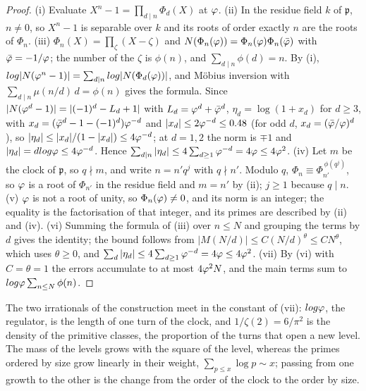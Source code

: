 \begin{proof}
(i) Evaluate $X^n-1=\prod_{d\mid n}\Phi_d(X)$ at $\varphi$.
(ii) In the residue field $k$ of $\mathfrak p$, $n\neq0$, so $X^n-1$ is separable over $k$ and its
roots of order exactly $n$ are the roots of $\Phi_n$.
(iii) $\Phi_n(X)=\prod_\zeta(X-\zeta)$ and $N(\Phi_n(\varphi))=\Phi_n(\varphi)\Phi_n(\bar{\varphi})$
with $\bar{\varphi}=-1/\varphi$; the number of the $\zeta$ is $\phi(n)$, and $\sum_{d\mid n}\phi(d)=n$.
By (i), $log|N(\varphi^n-1)|=\sum_{d\mid n}log|N(\Phi_d(\varphi))|$, and Möbius inversion with
$\sum_{d\mid n}\mu(n/d)\,d=\phi(n)$ gives the formula.  Since
$|N(\varphi^d-1)|=|(-1)^d-L_d+1|$ with $L_d=\varphi^d+\bar{\varphi}^d$,
$\eta_d=\log(1+x_d)$ for $d\geq3$, with $x_d=(\bar{\varphi}^d-1-(-1)^d)\varphi^{-d}$ and
$|x_d|\leq2\varphi^{-d}\leq0.48$ (for odd $d$, $x_d=(\bar{\varphi}/\varphi)^d$), so
$|\eta_d|\leq|x_d|/(1-|x_d|)\leq4\varphi^{-d}$; at
$d=1,2$ the norm is $\mp1$ and $|\eta_d|=dlog\varphi\leq4\varphi^{-d}$.  Hence
$\sum_{d\mid n}|\eta_d|\leq4\sum_{d\geq1}\varphi^{-d}=4\varphi\leq4\varphi^2$.
(iv) Let $m$ be the clock of $\mathfrak p$, so $q\nmid m$, and write $n=n'q^j$ with $q\nmid n'$.
Modulo $q$, $\Phi_n\equiv\Phi_{n'}^{\,\phi(q^j)}$, so $\varphi$ is a root of $\Phi_{n'}$ in the
residue field and $m=n'$ by (ii); $j\geq1$ because $q\mid n$.
(v) $\varphi$ is not a root of unity, so $\Phi_n(\varphi)\neq0$, and its norm is an integer; the
equality is the factorisation of that integer, and its primes are described by (ii) and (iv).
(vi) Summing the formula of (iii) over $n\leq N$ and grouping the terms by $d$ gives the identity;
the bound follows from $|M(N/d)|\leq C(N/d)^\theta\leq CN^\theta$, which uses $\theta\geq0$,
and $\sum_d|\eta_d|\leq4\sum_{d\geq1}\varphi^{-d}=4\varphi\leq4\varphi^2$.
(vii) By (vi) with $C=\theta=1$ the errors accumulate to at most $4\varphi^2N$, and the main terms
sum to $log\varphi\sum_{n\leq N}\phi(n)$.
\end{proof}

The two irrationals of the construction meet in the constant of (vii): $log\varphi$, the regulator,
is the length of one turn of the clock, and $1/\zeta(2)=6/\pi^2$ is the density of the primitive
classes, the proportion of the turns that open a new level.  The mass of the levels grows with the
square of the level, whereas the primes ordered by size grow linearly in their weight,
$\sum_{p\leq x}\log p\sim x$; passing from one growth to the other is the change from the order of
the clock to the order by size.

